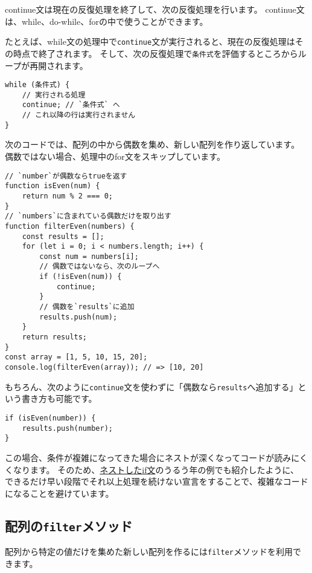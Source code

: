 continue文は現在の反復処理を終了して、次の反復処理を行います。
continue文は、while、do-while、forの中で使うことができます。

たとえば、while文の処理中で\texttt{continue}文が実行されると、現在の反復処理はその時点で終了されます。
そして、次の反復処理で\texttt{条件式}を評価するところからループが再開されます。

\begin{lstlisting}
while (条件式) {
    // 実行される処理
    continue; // `条件式` へ
    // これ以降の行は実行されません
}
\end{lstlisting}

次のコードでは、配列の中から偶数を集め、新しい配列を作り返しています。
偶数ではない場合、処理中のfor文をスキップしています。

\begin{lstlisting}
// `number`が偶数ならtrueを返す
function isEven(num) {
    return num % 2 === 0;
}
// `numbers`に含まれている偶数だけを取り出す
function filterEven(numbers) {
    const results = [];
    for (let i = 0; i < numbers.length; i++) {
        const num = numbers[i];
        // 偶数ではないなら、次のループへ
        if (!isEven(num)) {
            continue;
        }
        // 偶数を`results`に追加
        results.push(num);
    }
    return results;
}
const array = [1, 5, 10, 15, 20];
console.log(filterEven(array)); // => [10, 20]
\end{lstlisting}

もちろん、次のように\texttt{continue}文を使わずに「偶数なら\texttt{results}へ追加する」という書き方も可能です。

\begin{lstlisting}
if (isEven(number)) {
    results.push(number);
}
\end{lstlisting}

この場合、条件が複雑になってきた場合にネストが深くなってコードが読みにくくなります。
そのため、\href{../condition/README.md}{ネストしたif文}のうるう年の例でも紹介したように、
できるだけ早い段階でそれ以上処理を続けない宣言をすることで、複雑なコードになることを避けています。

\hypertarget{array-filter}{%
\subsection{\texorpdfstring{配列の\texttt{filter}メソッド}{配列のfilterメソッド}}\label{array-filter}}

配列から特定の値だけを集めた新しい配列を作るには\texttt{filter}メソッドを利用できます。

